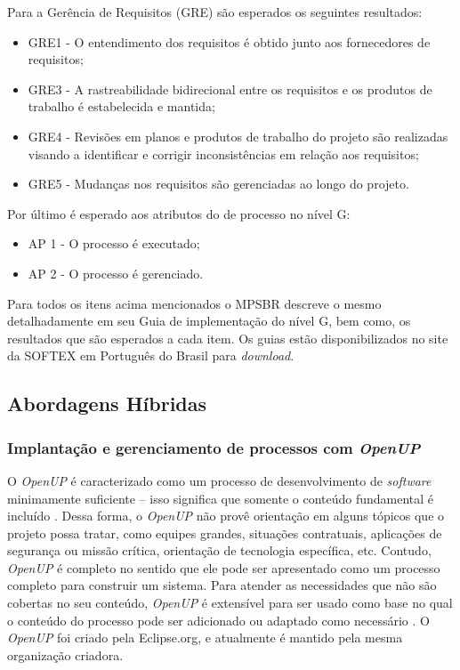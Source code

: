 \documentclass{acm_proc_article-sp}
\begin{document}
Para a Gerência de Requisitos (GRE) são esperados os seguintes resultados:
\begin{itemize}
\item GRE1 - O entendimento dos requisitos é obtido junto aos fornecedores de requisitos;
\item GRE3 - A rastreabilidade bidirecional entre os requisitos e os produtos de trabalho é estabelecida e mantida;
\item GRE4 - Revisões em planos e produtos de trabalho do projeto são realizadas visando a identificar e corrigir inconsistências em relação aos requisitos;
\item GRE5 - Mudanças nos requisitos são gerenciadas ao longo do projeto.
\end{itemize}

Por último é esperado aos atributos do de processo no nível G:
\begin{itemize}
\item AP 1 - O processo é executado;
\item AP 2 - O processo é gerenciado.
\end{itemize}

Para todos os itens acima mencionados o MPSBR \cite{mpsbr:nAgil} descreve o mesmo detalhadamente em seu Guia de implementação do nível G, bem como, os resultados que são esperados a cada item. Os guias estão disponibilizados no site da SOFTEX em Português do Brasil para \textit{download}.


\subsection{Abordagens Híbridas}

\subsubsection{Implantação e gerenciamento de processos com \textit{OpenUP}}
O \textit{OpenUP} é caracterizado como um processo de desenvolvimento de \textit{software} minimamente suficiente – isso
significa que somente o conteúdo fundamental é incluído \cite{openUP:agil}. Dessa forma, o \textit{OpenUP} não provê orientação em
alguns tópicos que o projeto possa tratar, como equipes grandes, situações contratuais, aplicações de segurança ou missão crítica, orientação de tecnologia específica, etc. Contudo, \textit{OpenUP} é completo no sentido que ele pode ser apresentado como um processo completo para construir um sistema. Para atender as necessidades que não são cobertas no seu conteúdo, \textit{OpenUP} é extensível para ser usado como base no qual o conteúdo do processo pode ser adicionado ou adaptado como necessário \cite{openUP:agil}. O \textit{OpenUP} foi criado pela Eclipse.org, e atualmente é mantido pela mesma organização criadora.
\end{document}
